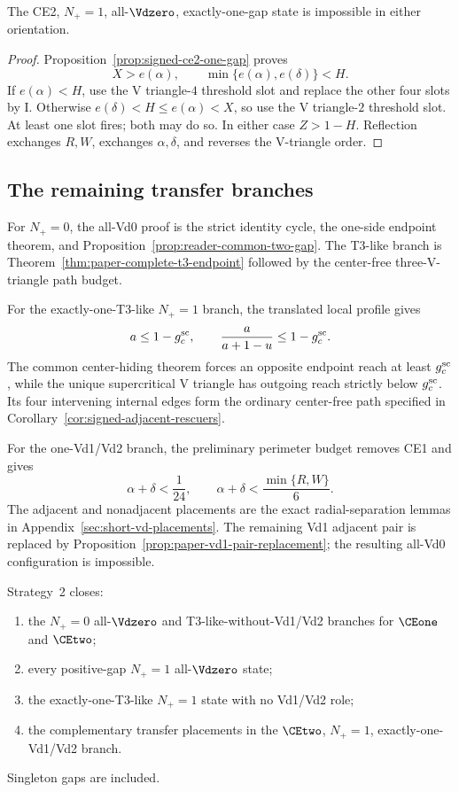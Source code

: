\begin{corollary}
\label{prop:reader-ce2-one-gap}
The CE2, $N_+=1$, all-$\Vdzero$, exactly-one-gap state is impossible in either
orientation.
\end{corollary}

\begin{proof}
Proposition~\ref{prop:signed-ce2-one-gap} proves
\[
 X>e(\alpha),\qquad
 \min\{e(\alpha),e(\delta)\}<H.
\]
If $e(\alpha)<H$, use the V triangle-$4$ threshold slot and replace the other four
slots by $\mathrm I$.  Otherwise
$e(\delta)<H\le e(\alpha)<X$, so use the V triangle-$2$ threshold slot.  At least one
slot fires; both may do so.  In either case $Z>1-H$.  Reflection exchanges
$R,W$, exchanges $\alpha,\delta$, and reverses the V-triangle order.
\end{proof}

\subsection{The remaining transfer branches}

For $N_+=0$, the all-Vd0 proof is the strict identity cycle, the one-side
endpoint theorem, and Proposition~\ref{prop:reader-common-two-gap}.  The
T3-like branch is Theorem~\ref{thm:paper-complete-t3-endpoint} followed by the
center-free three-V-triangle path budget.

For the exactly-one-T3-like $N_+=1$ branch, the translated local profile gives
\[
 a\le1-g_c^{\rm sc},\qquad
 \frac{a}{a+1-u}\le1-g_c^{\rm sc}.
\]
The common center-hiding theorem forces an opposite endpoint reach at least
$g_c^{\rm sc}$, while the unique supercritical V triangle has outgoing reach strictly
below $g_c^{\rm sc}$.  Its four intervening internal edges form the ordinary
center-free path specified in Corollary~\ref{cor:signed-adjacent-rescuers}.

For the one-Vd1/Vd2 branch, the preliminary perimeter budget removes CE1 and
gives
\[
 \alpha+\delta<\frac1{24},\qquad
 \alpha+\delta<\frac{\min\{R,W\}}6.
\]
The adjacent and nonadjacent placements are the exact radial-separation
lemmas in Appendix~\ref{sec:short-vd-placements}.  The remaining Vd1 adjacent
pair is replaced by Proposition~\ref{prop:paper-vd1-pair-replacement}; the
resulting all-Vd0 configuration is impossible.

\begin{proposition}
\label{prop:reader-demand-branches}
Strategy~2 closes:
\begin{enumerate}
\item the $N_+=0$ all-$\Vdzero$ and T3-like-without-Vd1/Vd2 branches for
      $\CEone$ and $\CEtwo$;
\item every positive-gap $N_+=1$ all-$\Vdzero$ state;
\item the exactly-one-T3-like $N_+=1$ state with no Vd1/Vd2 role;
\item the complementary transfer placements in the $\CEtwo$, $N_+=1$,
      exactly-one-Vd1/Vd2 branch.
\end{enumerate}
Singleton gaps are included.
\end{proposition}

